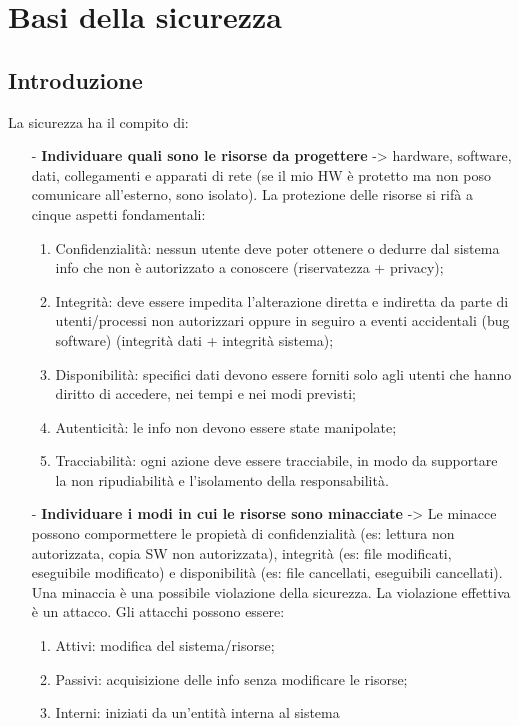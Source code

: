 \documentclass[a4paper, 10pt]{report}
\begin{document}
\chapter{Basi della sicurezza}

\section{Introduzione}
La sicurezza ha il compito di:
\begin{itemize}
\item[-] \textbf{Individuare quali sono le risorse da progettere} -> hardware, software, dati, collegamenti e apparati di rete (se il mio HW è protetto ma non poso comunicare all'esterno, sono isolato).
La protezione delle risorse si rifà a cinque aspetti fondamentali:
\begin{enumerate}
\item Confidenzialità: nessun utente deve poter ottenere o dedurre dal sistema info che non è autorizzato a conoscere (riservatezza + privacy);
\item Integrità: deve essere impedita l'alterazione diretta e indiretta da parte di utenti/processi non autorizzari oppure in seguiro a eventi accidentali (bug software) (integrità dati + integrità sistema);
\item Disponibilità: specifici dati devono essere forniti solo agli utenti che hanno diritto di accedere, nei tempi e nei modi previsti;
\item Autenticità: le info non devono essere state manipolate;
\item Tracciabilità: ogni azione deve essere tracciabile, in modo da supportare la non ripudiabilità e l'isolamento della responsabilità.
\end{enumerate}
\item[-] \textbf{Individuare i modi in cui le risorse sono minacciate} -> Le minacce possono compormettere le propietà di confidenzialità (es: lettura non autorizzata, copia SW non autorizzata), integrità (es: file modificati, eseguibile modificato) e disponibilità (es: file cancellati, eseguibili cancellati). Una minaccia è una possibile violazione della sicurezza. La violazione effettiva è un attacco. Gli attacchi possono essere:
\begin{enumerate}
\item Attivi: modifica del sistema/risorse;
\item Passivi: acquisizione delle info senza modificare le risorse;
\item Interni: iniziati da un'entità interna al sistema

\end{enumerate}
\end{itemize}
\end{document}
